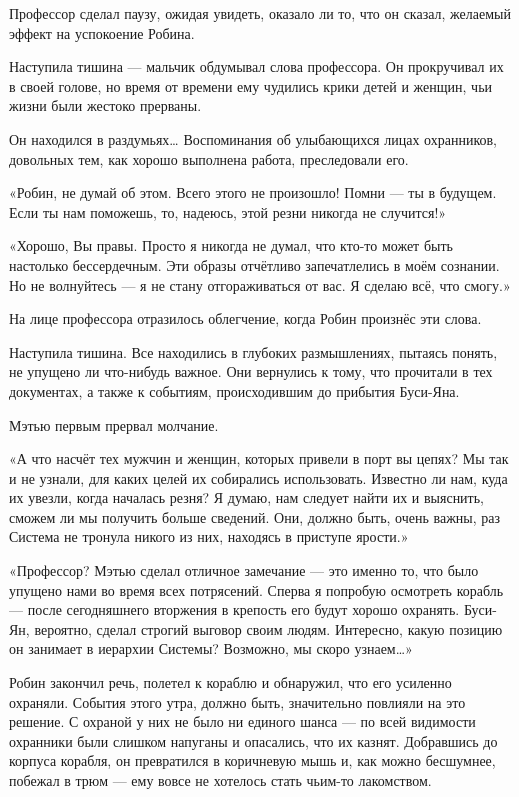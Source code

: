 \documentclass[a4paper,12pt]{book}
\begin{document}
\par
Профессор сделал паузу, ожидая увидеть, оказало ли то, что он сказал, желаемый эффект на успокоение Робина.
\par
Наступила тишина — мальчик обдумывал слова профессора. Он прокручивал их в своей голове, но время от времени ему чудились крики детей и женщин, чьи жизни были жестоко прерваны.
\par
Он находился в раздумьях… Воспоминания об улыбающихся лицах охранников, довольных тем, как хорошо выполнена работа, преследовали его.
\par
«Робин, не думай об этом. Всего этого не произошло! Помни — ты в будущем. Если ты нам поможешь, то, надеюсь, этой резни никогда не случится!»
\par
«Хорошо, Вы правы. Просто я никогда не думал, что кто-то может быть настолько бессердечным. Эти образы отчётливо запечатлелись в моём сознании. Но не волнуйтесь — я не стану отгораживаться от вас. Я сделаю всё, что смогу.»
\par
На лице профессора отразилось облегчение, когда Робин произнёс эти слова.
\par
Наступила тишина. Все находились в глубоких размышлениях, пытаясь понять, не упущено ли что-нибудь важное. Они вернулись к тому, что прочитали в тех документах, а также к событиям, происходившим до прибытия Буси-Яна.
\par
Мэтью первым прервал молчание.
\par
«А что насчёт тех мужчин и женщин, которых привели в порт вы цепях? Мы так и не узнали, для каких целей их собирались использовать. Известно ли нам, куда их увезли, когда началась резня? Я думаю, нам следует найти их и выяснить, сможем ли мы получить больше сведений. Они, должно быть, очень важны, раз Система не тронула никого из них, находясь в приступе ярости.»
\par
«Профессор? Мэтью сделал отличное замечание — это именно то, что было упущено нами во время всех потрясений. Сперва я попробую осмотреть корабль — после сегодняшнего вторжения в крепость его будут хорошо охранять. Буси-Ян, вероятно, сделал строгий выговор своим людям. Интересно, какую позицию он занимает в иерархии Системы? Возможно, мы скоро узнаем…»
\par
Робин закончил речь, полетел к кораблю и обнаружил, что его усиленно охраняли. События этого утра, должно быть, значительно повлияли на это решение. С охраной у них не было ни единого шанса — по всей видимости охранники были слишком напуганы и опасались, что их казнят. Добравшись до корпуса корабля, он превратился в коричневую мышь и, как можно бесшумнее, побежал в трюм — ему вовсе не хотелось стать чьим-то лакомством.
\end{document}
